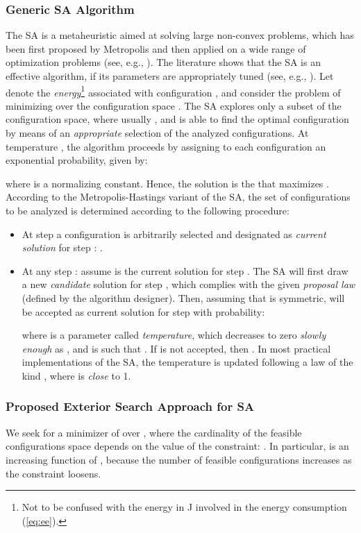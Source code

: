 \documentclass[draftcls,onecolumn]{IEEEtran}
\theoremstyle{plain}
\theoremstyle{definition}
\begin{document}
\subsubsection{Generic SA Algorithm} 
The SA is a metaheuristic aimed at solving large non-convex problems, which has been first proposed by Metropolis \cite{Metropolis1953} and then applied on a wide range of optimization problems (see, e.g., \cite{Kirkpatrick1983,Keung2010}). The literature shows that the SA is an effective algorithm, if its parameters are appropriately tuned (see, e.g., \cite{Roubini99}). Let  denote the {\it energy}\footnote{Not to be confused with the energy in J involved in the energy consumption (\ref{eq:ee}).} associated with configuration , and consider the problem of minimizing  over the configuration space . 
The SA explores only a subset  of the configuration space, where usually , and is able to find the optimal configuration by means of an {\it appropriate} selection of the analyzed configurations. At temperature , the algorithm proceeds by assigning to each configuration  an exponential probability, given by:
 
where  is a normalizing constant. 
Hence, the solution is the  that maximizes . According to the Metropolis-Hastings variant \cite{Hastings1970} of the SA, the set  of configurations to be analyzed is determined according to the following procedure: 
\begin{itemize}
	\item At step  a configuration  is arbitrarily selected and designated as {\it current solution}  for step : .
	\item At any step : assume  is the current solution for step .
The SA will first draw a new {\it candidate} solution  for step , which complies with the given {\it proposal law}  (defined by the algorithm designer). 
Then, assuming that  is symmetric,  will be accepted as current solution for step  with probability:  

where  is a parameter called {\it temperature}, which decreases to zero {\it slowly enough}  as , and is such that .
If  is not accepted, then . In most practical implementations of the SA, the temperature is updated following a law of the kind , where  is {\it close} to 1.
\end{itemize}



\subsubsection{Proposed Exterior Search Approach for SA}
We seek for a minimizer of  over , where the cardinality of the feasible configurations space  depends on the value of the constraint: . In particular,  is an increasing function of , because the number of feasible configurations increases as the constraint loosens. 
\end{document}

